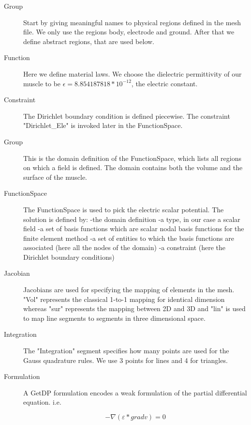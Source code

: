 \documentclass[preprint,journal]{vgtc}       %
\begin{document}
\begin{description}
	\item[Group]
	Start by giving meaningful names to physical regions defined in the mesh file.
	We only use the regions body, electrode and ground. 
	After that we define abstract regions, that are used below.
	\item[Function]
	Here we define material laws.
	We choose the dielectric permittivity of our muscle to be $\epsilon = 8.854187818 *10^{-12}$, the electric constant.
	\item[Constraint]
	The Dirichlet boundary condition is defined piecewise. 
	The constraint "Dirichlet\_Ele" is invoked later in the FunctionSpace.
	\item[Group]
	This is the domain definition of the FunctionSpace, which lists all regions on which a field is defined. 
	The domain contains both the volume and the surface of the muscle.
	\item[FunctionSpace]
	The FunctionSpace is used to pick the electric scalar potential. 
	The solution is defined  by:\newline
	-the domain definition\newline
	-a type, in our case a scalar field\newline
	-a set of basis functions which are scalar nodal basis functions for the finite element method\newline 
	-a set of entities to which the basis functions are associated (here all the nodes of the domain)\newline
	-a constraint (here the Dirichlet boundary conditions)
	
	\item[Jacobian] 
	Jacobians are used for specifying the mapping of elements in the mesh.
	"Vol" represents the classical 1-to-1 mapping for identical dimension whereas "sur" represents the mapping between 2D and 3D and "lin" is used to map line segments to segments in three dimensional space.
	
	\item[Integration]
	The "Integration" segment specifies how many points are used for the Gauss quadrature rules. 
	We use 3 points for lines and 4 for triangles.
	
	\item[Formulation]
	A GetDP formulation encodes a weak formulation of the partial differential equation. i.e. 
	
	
	\[-\nabla (\varepsilon *\mathrel{grad} v) = 0\]
	

\end{description}
\end{document}
